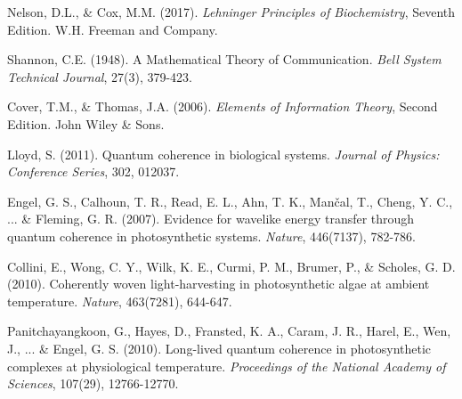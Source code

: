 \documentclass[12pt,a4paper]{article}
\begin{document}
\begin{thebibliography}{99}
Nelson, D.L., \& Cox, M.M. (2017). \textit{Lehninger Principles of Biochemistry}, Seventh Edition. W.H. Freeman and Company.

Shannon, C.E. (1948). A Mathematical Theory of Communication. \textit{Bell System Technical Journal}, 27(3), 379-423.

Cover, T.M., \& Thomas, J.A. (2006). \textit{Elements of Information Theory}, Second Edition. John Wiley \& Sons.

Lloyd, S. (2011). Quantum coherence in biological systems. \textit{Journal of Physics: Conference Series}, 302, 012037.

Engel, G. S., Calhoun, T. R., Read, E. L., Ahn, T. K., Mančal, T., Cheng, Y. C., ... \& Fleming, G. R. (2007). Evidence for wavelike energy transfer through quantum coherence in photosynthetic systems. \textit{Nature}, 446(7137), 782-786.

Collini, E., Wong, C. Y., Wilk, K. E., Curmi, P. M., Brumer, P., \& Scholes, G. D. (2010). Coherently woven light-harvesting in photosynthetic algae at ambient temperature. \textit{Nature}, 463(7281), 644-647.

Panitchayangkoon, G., Hayes, D., Fransted, K. A., Caram, J. R., Harel, E., Wen, J., ... \& Engel, G. S. (2010). Long-lived quantum coherence in photosynthetic complexes at physiological temperature. \textit{Proceedings of the National Academy of Sciences}, 107(29), 12766-12770.

\end{thebibliography}
\end{document}
